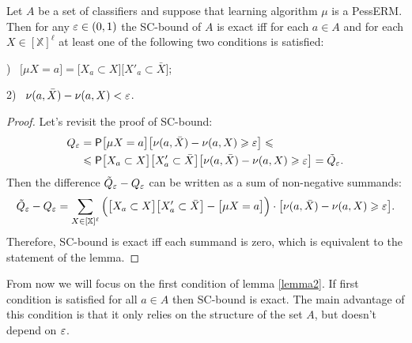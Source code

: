 \documentclass{article}
\def\XX{\mathbb{X}}
\newcommand{\XXell}{[\XX]^\ell}
\newcommand{\X}{\bar X}
\renewcommand{\geq}{\geqslant}
\renewcommand{\leq}{\leqslant}
\providecommand{\Prob}{\mathsf{P}}
\begin{document}
\begin{lemma}
\label{lemma2}
Let $A$ be a set of classifiers and suppose that learning algorithm $\mu$ is a PessERM.
Then for any $\varepsilon \in (0,1)$ the SC-bound of $A$ is exact iff
for each $a \in A$ and for each $X \in \XXell$ at least one of the following two conditions is satisfied:

    )~ $\bigl[\mu X = a\bigr] = \bigl[X_{a} \subset X\bigr]\bigl[X'_{a} \subset \X\bigr]$;

    2)~ $\nu(a,\X) - \nu(a, X) < \eps$.
\end{lemma}

\begin{proof}
Let's revisit the proof of SC-bound:
\begin{align*}
    Q_\eps & =    \Prob\bigl[\mu X = a\bigr]\bigl[ \nu(a,\X) - \nu(a,X) \geq \eps \bigr] \leq \\
           & \leq \Prob\bigl[X_{a} \subset X\bigr]\bigl[X'_{a} \subset \X\bigr]\bigl[ \nu(a,\X) - \nu(a,X) \geq \eps \bigr] = \tilde Q_\eps.
\end{align*}
Then the difference $\tilde Q_\varepsilon - Q_\varepsilon$ can be written as a sum of non-negative summands:
\[
    \tilde Q_\eps - Q_\eps =
        \sum_{X \in \XXell}
                    \Big(\bigl[X_{a} \subset X\bigr]\bigl[X'_{a} \subset \X\bigr] - \bigl[\mu X = a\bigr]\Big)
                    \cdot \bigl[ \nu(a,\X) - \nu(a,X) \geq \eps \bigr].
\]
Therefore, SC-bound is exact iff each summand is zero, which is equivalent to the statement of the lemma.
\end{proof}

From now we will focus on the first condition of lemma \ref{lemma2}. If first condition is satisfied for all $a \in A$ then SC-bound is exact.
The main advantage of this condition is that it only relies on the structure of the set $A$, but doesn't depend on $\varepsilon$.
\end{document}
